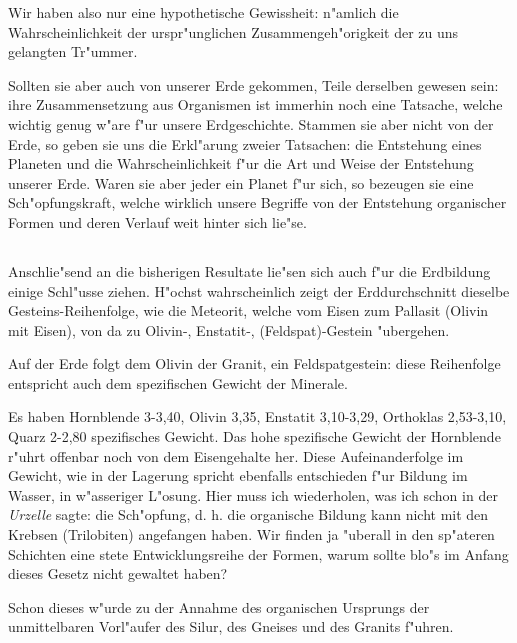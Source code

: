 \documentclass[a4paper, 11pt, oneside]{article}
\begin{document}
Wir haben also nur eine hypothetische Gewissheit: n"amlich die Wahrscheinlichkeit der urspr"unglichen Zusammengeh"origkeit der zu uns gelangten Tr"ummer.

Sollten sie aber auch von unserer Erde gekommen, Teile derselben gewesen sein: ihre Zusammensetzung aus Organismen ist immerhin noch eine Tatsache, welche wichtig genug w"are f"ur unsere Erdgeschichte. Stammen sie aber nicht von der Erde, so geben sie uns die Erkl"arung zweier Tatsachen: die Entstehung eines Planeten und die Wahrscheinlichkeit f"ur die Art und Weise der Entstehung unserer Erde. Waren sie aber jeder ein Planet f"ur sich, so bezeugen sie eine Sch"opfungskraft, welche wirklich unsere Begriffe von der Entstehung organischer Formen und deren Verlauf weit hinter sich lie"se.
\clearpage
\subsection{}
\paragraph{}
Anschlie"send an die bisherigen Resultate lie"sen sich auch f"ur die Erdbildung einige Schl"usse ziehen. H"ochst wahrscheinlich zeigt der Erddurchschnitt dieselbe Gesteins-Reihenfolge, wie die Meteorit, welche vom Eisen zum Pallasit (Olivin mit Eisen), von da zu Olivin-, Enstatit-, (Feldspat)-Gestein "ubergehen.

Auf der Erde folgt dem Olivin der Granit, ein Feldspatgestein: diese Reihenfolge entspricht auch dem spezifischen Gewicht der Minerale.

Es haben Hornblende 3-3,40, Olivin 3,35, Enstatit 3,10-3,29, Orthoklas 2,53-3,10, Quarz 2-2,80 spezifisches Gewicht. Das hohe spezifische Gewicht der Hornblende r"uhrt offenbar noch von dem Eisengehalte her. Diese Aufeinanderfolge im Gewicht, wie in der Lagerung spricht ebenfalls entschieden f"ur Bildung im Wasser, in w"asseriger L"osung. Hier muss ich wiederholen, was ich schon in der \emph{Urzelle} sagte: die Sch"opfung, d. h. die organische Bildung kann nicht mit den Krebsen (Trilobiten) angefangen haben. Wir finden ja "uberall in den sp"ateren Schichten eine stete Entwicklungsreihe der Formen, warum sollte blo"s im Anfang dieses Gesetz nicht gewaltet haben?

Schon dieses w"urde zu der Annahme des organischen Ursprungs der unmittelbaren Vorl"aufer des Silur, des Gneises und des Granits f"uhren.
\end{document}
